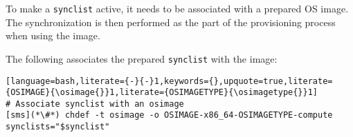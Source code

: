 To make a \texttt{synclist} active, it needs to be associated with a prepared OS
image. The synchronization is then performed as the part of the provisioning
process when using the image.


The following associates the prepared \texttt{synclist} with the \installmode{} \xCAT{} image:

\begin{lstlisting}[language=bash,literate={-}{-}1,keywords={},upquote=true,literate={OSIMAGE}{\osimage{}}1,literate={OSIMAGETYPE}{\osimagetype{}}1]
# Associate synclist with an osimage
[sms](*\#*) chdef -t osimage -o OSIMAGE-x86_64-OSIMAGETYPE-compute synclists="$synclist"
\end{lstlisting}
